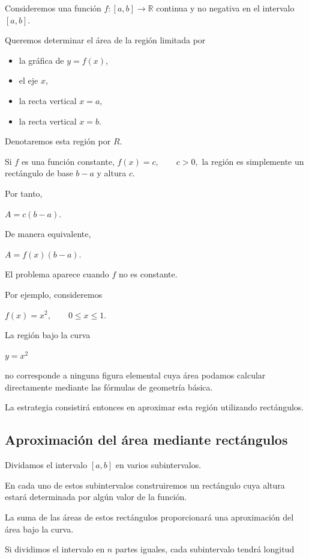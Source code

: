 \documentclass[12pt]{article}
\begin{document}
Consideremos una función
$
f:[a,b]\longrightarrow\mathbb{R}
$
continua y no negativa en el intervalo $[a,b]$.

Queremos determinar el área de la región limitada por

\begin{itemize}
    \item la gráfica de $y=f(x)$,
    \item el eje $x$,
    \item la recta vertical $x=a$,
    \item la recta vertical $x=b$.
\end{itemize}

Denotaremos esta región por $R$.

Si $f$ es una función constante,
$
f(x)=c,
\qquad c>0,
$
la región es simplemente un rectángulo de base $b-a$ y altura $c$.

Por tanto,

$
A=c(b-a).
$

De manera equivalente,

$
A=f(x)(b-a).
$

El problema aparece cuando $f$ no es constante.

Por ejemplo, consideremos

$
f(x)=x^2,
\qquad 0\leq x\leq1.
$

La región bajo la curva

$
y=x^2
$

no corresponde a ninguna figura elemental cuya área podamos calcular
directamente mediante las fórmulas de geometría básica.

La estrategia consistirá entonces en aproximar esta región utilizando
rectángulos.

\subsection*{Aproximación del área mediante rectángulos}

Dividamos el intervalo $[a,b]$ en varios subintervalos.

En cada uno de estos subintervalos construiremos un rectángulo cuya altura
estará determinada por algún valor de la función.

La suma de las áreas de estos rectángulos proporcionará una aproximación
del área bajo la curva.

Si dividimos el intervalo en $n$ partes iguales, cada subintervalo tendrá
longitud
\end{document}
